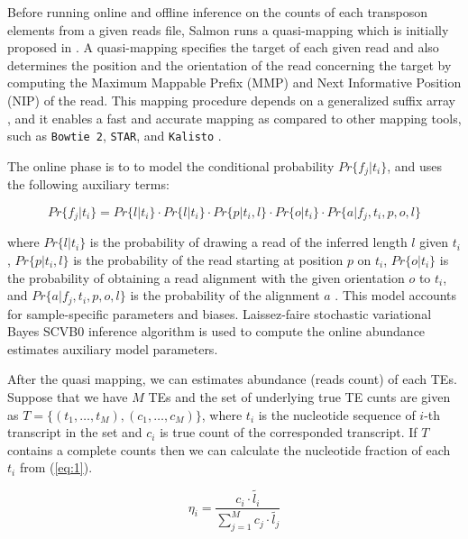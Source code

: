 \documentclass{ws-procs11x85}
\begin{document}
Before running online and offline inference on the counts of each transposon elements from a given reads file,
Salmon runs a quasi-mapping which is initially proposed in \cite{srivastava2016rapmap}. A quasi-mapping specifies the target of each given read and also determines the position and the orientation of the read concerning the target by computing the
Maximum Mappable Prefix (MMP) \cite{li2012exploring} and Next Informative Position (NIP) \cite{srivastava2016rapmap} of the read.
This mapping procedure depends on a generalized suffix array \cite{manber1993suffix}, 
and it enables a fast and accurate mapping as compared to other mapping tools, such as \verb|Bowtie 2|, \verb|STAR|, and \verb|Kalisto| \cite{srivastava2016rapmap}. 

The online phase is to  to model the conditional probability $Pr \{f_j | t_i \}$, and
uses the following auxiliary terms:

\begin{equation}
Pr \{f_j | t_i \} = Pr \{ l | t_i \} 
\cdot Pr \{ l | t_i \} 
\cdot Pr \{ p | t_i, l \} 
\cdot Pr \{ o | t_i \} 
\cdot Pr \{ a | f_j, t_i, p, o, l \} 
\end{equation}

where $Pr \{ l | t_i \}$ 
is the probability of drawing a read of the inferred length $l$ given $t_i$,  
$Pr \{ p | t_i, l \}$ is the probability of the read starting at position $p$ on $t_i$,
$Pr \{ o | t_i \}$ is the probability of obtaining a read
alignment with the given orientation $o$ to $t_i$, and
$Pr \{ a | f_j, t_i, p, o, l \} $ is the probability of the alignment $a$ \cite{patro2017salmon}. 
This model accounts for sample-specific parameters and biases.
Laissez-faire stochastic variational Bayes SCVB0 inference algorithm is used to 
compute the online abundance estimates auxiliary model parameters\cite{patro2017salmon}.

After the quasi mapping, 
we can estimates abundance (reads count) of each TEs. 
Suppose that
we have $M$ TEs and the set of underlying true TE cunts are given as
$T = \{(t_1, \dots , t_M), (c_1, \dots, c_M) \}$, where $t_i$ is the nucleotide sequence of $i$-th transcript in the set and $c_i$ is true count of the corresponded transcript. 
If $T$ contains a complete counts then we can calculate the nucleotide fraction \cite{li2009rna} of each $t_i$ from (\ref{eq:1}).
 

\begin{equation} \label{eq:1}
\eta_i = \frac{c_i \cdot \widetilde{l_i} }{\sum_{j=1}^{M} c_j \cdot \widetilde{l_j}}
\end{equation}
\end{document}
